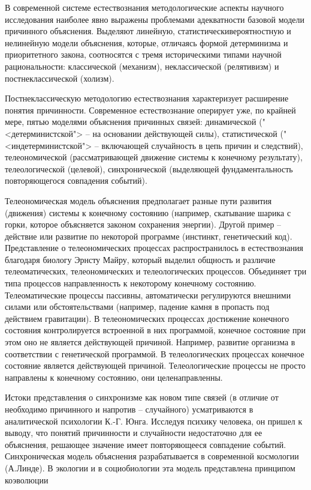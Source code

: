 \documentclass[exam_answers.tex]{subfiles}
\begin{document}
В современной системе естествознания методологические аспекты
научного исследования наиболее явно выражены проблемами адекватности
базовой модели причинного объяснения. Выделяют линейную, статистическивероятностную и нелинейную модели объяснения, которые, отличаясь формой
детерминизма и приоритетного закона, соотносятся с тремя историческими
типами научной рациональности: классической (механизм), неклассической
(релятивизм) и постнеклассической (холизм).

Постнеклассическую методологию естествознания характеризует
расширение понятия причинности.
Современное естествознание оперирует уже,
по крайней мере, пятью моделями объяснения причинных связей:
динамической ("<детерминистской"> -- на основании действующей силы),
статистической ("<индетерминистской"> -- включающей случайность в цепь
причин и следствий), телеономической (рассматривающей движение системы
к конечному результату), телеологической (целевой), синхронической
(выделяющей фундаментальность повторяющегося совпадения событий).

Телеономическая модель объяснения предполагает разные пути развития
(движения) системы к конечному состоянию (например, скатывание шарика с
горки, которое объясняется законом сохранения энергии). Другой пример --
действие или развитие по некоторой программе (инстинкт, генетический код).
Представление о телеономических процессах распространилось в
естествознания благодаря биологу Эрнсту Майру, который выделил общность и
различие телеоматических, телеономических и телеологических процессов.
Объединяет три типа процессов направленность к некоторому конечному
состоянию.
Телеоматические процессы пассивны, автоматически регулируются
внешними силами или обстоятельствами (например, падение камня в пропасть
под действием гравитации).
В телеономических процессах достижение
конечного состояния контролируется встроенной в них программой, конечное
состояние при этом оно не является действующей причиной.
Например, развитие организма в соответствии с генетической программой.
В телеологических процессах конечное состояние является действующей
причиной. Телеологические процессы не просто направлены к конечному
состоянию, они целенаправленны.

Истоки представления о синхронизме как новом типе связей (в отличие от
необходимо причинного и напротив -- случайного) усматриваются в
аналитической психологии К.-Г. Юнга.
Исследуя психику человека, он пришел к выводу, что понятий причинности и случайности недостаточно для ее
объяснения, решающее значение имеет повторяющееся совпадение событий.
Синхроническая модель объяснения разрабатывается в современной космологии (А.Линде).
В экологии и в социобиологии эта модель представлена принципом коэволюции
\end{document}
